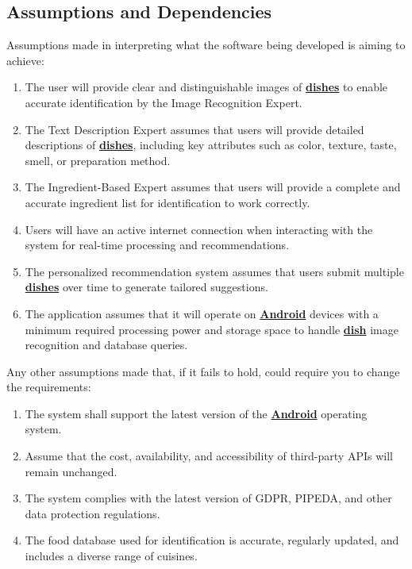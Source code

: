 \documentclass[]{article}
\begin{document}
\subsection{Assumptions and Dependencies}
\label{sub:assumptions_and_dependencies}
Assumptions made in interpreting what the software being developed is aiming to achieve:
	\begin{enumerate}
		\item The user will provide clear and distinguishable images of \hyperref[Dish]{\textbf{dishes}} to enable accurate identification by the Image Recognition Expert.
		\item The Text Description Expert assumes that users will provide detailed descriptions of \hyperref[Dish]{\textbf{dishes}}, including key attributes such as color, texture, taste, smell, or preparation method.
		\item The Ingredient-Based Expert assumes that users will provide a complete and accurate ingredient list for identification to work correctly.
		\item Users will have an active internet connection when interacting with the system for real-time processing and recommendations.
		\item The personalized recommendation system assumes that users submit multiple \hyperref[Dish]{\textbf{dishes}} over time to generate tailored suggestions.
		\item The application assumes that it will operate on \hyperref[Android]{\textbf{Android}} devices with a minimum required processing power and storage space to handle \hyperref[Dish]{\textbf{dish}} image recognition and database queries.
	\end{enumerate}

Any other assumptions made that, if it fails to hold, could require you to change the requirements:
	\begin{enumerate}
		\item The system shall support the latest version of the \hyperref[Android]{\textbf{Android}} operating system.
		\item Assume that the cost, availability, and accessibility of third-party APIs will remain unchanged.
		\item The system complies with the latest version of GDPR, PIPEDA, and other data protection regulations.
		\item The food database used for identification is accurate, regularly updated, and includes a diverse range of cuisines.
	\end{enumerate}
\end{document}
